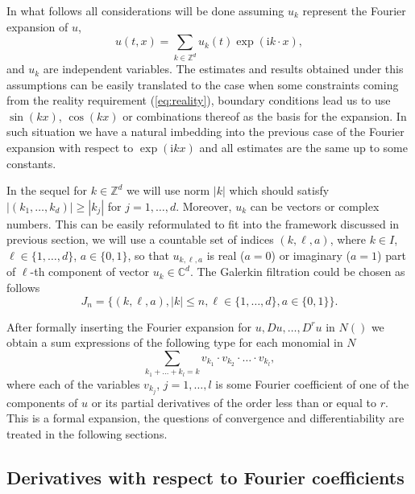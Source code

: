 In what follows all considerations will be done assuming $u_k$ represent the Fourier expansion of $u$,
\begin{equation}
  u(t,x)=\sum_{k \in \mathbb{Z}^d} u_k(t) \exp(\mathrm{i} k \cdot x), \label{eq:u-furier}
\end{equation}
 and $u_k$ are independent variables. The estimates
and results obtained under this assumptions can be easily translated to the case when some constraints coming from the reality requirement (\ref{eq:reality}), boundary conditions
lead us to use $\sin(kx)$, $\cos(kx)$ or combinations  thereof as the basis for the expansion.  In such situation we have a natural imbedding into the previous case of the Fourier expansion with respect to
$\exp(\mathrm{i} kx)$ and all estimates are the same up to some constants.  


In the sequel for $k \in \mathbb{Z}^d$ we will use norm $|k|$ which should satisfy \newline
 $|(k_1,\dots,k_d)| \geq |k_j|$ for $j=1,\dots,d$. Moreover, $u_k$ can be vectors or complex numbers. This can be easily reformulated to fit into the framework discussed in previous section, we will use a countable set of indices  $(k,\ell,a)$, where $k \in I$, $\ell \in \{1,\dots,d\}$, $a \in \{0,1\}$, so that $u_{k,\ell,a}$ is real ($a=0$) or imaginary ($a=1$) part of $\ell$-th component of vector $u_k \in \mathbb{C}^d$. The Galerkin filtration could be chosen as follows 
 \begin{equation}
 J_n=\{(k,\ell,a), |k| \leq n, \ell \in \{1,\dots,d\}, a \in \{0,1\}\}.
 \end{equation} 


 After formally inserting the Fourier expansion   for $u,Du,\dots,D^r u$  in $N()$ we obtain a sum
 expressions of the following type for each monomial in $N$
\begin{equation*}
  \sum_{k_1+\dots + k_l=k} v_{k_1} \cdot  v_{k_2} \cdot
  \dots \cdot v_{k_l},
\end{equation*}
where  each of the variables $v_{k_j}$, $j=1,\dots,l$ is some Fourier coefficient of one of the components of $u$ or its partial derivatives of the order less than or equal to $r$.  This is a formal expansion, the questions of convergence and differentiability are treated in the following sections.

\subsection{Derivatives with respect to Fourier coefficients}

